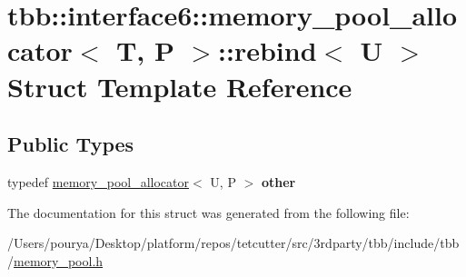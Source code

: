 \hypertarget{structtbb_1_1interface6_1_1memory__pool__allocator_1_1rebind}{}\section{tbb\+:\+:interface6\+:\+:memory\+\_\+pool\+\_\+allocator$<$ T, P $>$\+:\+:rebind$<$ U $>$ Struct Template Reference}
\label{structtbb_1_1interface6_1_1memory__pool__allocator_1_1rebind}
\subsection*{Public Types}
\begin{DoxyCompactItemize}
\item 
\hypertarget{structtbb_1_1interface6_1_1memory__pool__allocator_1_1rebind_a1e9f9c6f0163df16980598fcafca665b}{}typedef \hyperlink{classtbb_1_1interface6_1_1memory__pool__allocator}{memory\+\_\+pool\+\_\+allocator}$<$ U, P $>$ {\bfseries other}\label{structtbb_1_1interface6_1_1memory__pool__allocator_1_1rebind_a1e9f9c6f0163df16980598fcafca665b}

\end{DoxyCompactItemize}


The documentation for this struct was generated from the following file\+:\begin{DoxyCompactItemize}
\item 
/\+Users/pourya/\+Desktop/platform/repos/tetcutter/src/3rdparty/tbb/include/tbb/\hyperlink{memory__pool_8h}{memory\+\_\+pool.\+h}\end{DoxyCompactItemize}
